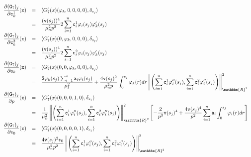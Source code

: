 \documentclass[a4paper,10pt]{book}
\newcommand{\R}{\mathbbm{R}}
\begin{document}
\[
\begin{array}{ccl}
\displaystyle\frac{\partial(\texttt{G}_7)_j}{\partial\texttt{c}^1_k}(\texttt{x})&=&\langle G'_7(x)(\varphi_k,0,0,0,0) , \delta_{s_j}\rangle\\
&=&\displaystyle\frac{(\texttt{v}(s_j))^4}{\mu_n^2p^2}2\sum_{i=1}^n\texttt{c}^{1}_i\varphi_i(s_j)\varphi_k'(s_j)\\
\displaystyle\frac{\partial(\texttt{G}_7)_j}{\partial\texttt{c}^2_k}(\texttt{x})&=&\langle G'_7(x)(0,\varphi_k,0,0,0) , \delta_{s_j}\rangle\\
&=&\displaystyle\frac{(\texttt{v}(s_j))^4}{\mu_n^2p^2}2\sum_{i=1}^n\texttt{c}^{2}_i\varphi_i(s_j)\varphi_k'(s_j)\\
\displaystyle\frac{\partial(\texttt{G}_7)_j}{\partial\texttt{a}_k}(\texttt{x})&=&\langle G'_7(x)(0,0,\varphi_k,0,0) , \delta_{s_j}\rangle\\
&=&\displaystyle\frac{2\varphi_k(s_j)\sum_{i=1}^n\texttt{a}_i\varphi_i(s_j)}{\mu_t^2}+\frac{4\texttt{v}(s_j)^2}{\mu_n^2p}\int_0^{s_j}\varphi_k(r)dr\left\| \left(\sum_{i=1}^n\texttt{c}^{1}_i\varphi_i''(s_j), \sum_{i=1}^n\texttt{c}^{2}_i\varphi_i''(s_j)\right) \right\|_{\R^2}^2\\
\displaystyle\frac{\partial(\texttt{G}_7)_j}{\partial p}(\texttt{x})&=&\langle G'_7(x)(0,0,0,1,0) , \delta_{s_j}\rangle\\
&=&\displaystyle\frac{1}{\mu_n^2}\left\| \left(\sum_{i=1}^n\texttt{c}^{1}_i\varphi_i''(s_j), \sum_{i=1}^n\texttt{c}^{2}_i\varphi_i''(s_j)\right) \right\|_{\R^2}^2\left[-\frac{2}{p^3}\texttt{v}(s_j)^4+\frac{4\texttt{v}(s_j)^4}{p^2}\sum_{i=1}^n\texttt{a}_i\int_0^{s_j} \varphi_i(r)dr\right]\\
\displaystyle\frac{\partial(\texttt{G}_7)_j}{\partial v_0}(\texttt{x})&=&\langle G'_7(x)(0,0,0,0,1) , \delta_{s_j}\rangle\\
&=&\displaystyle\frac{4\texttt{v}(s_j)^2v_0}{\mu_n^2p^2}\left\| \left(\sum_{i=1}^n\texttt{c}^{1}_i\varphi_i''(s_j), \sum_{i=1}^n\texttt{c}^{2}_i\varphi_i''(s_j)\right) \right\|_{\R^2}^2\\
\end{array}
\]
\end{document}
